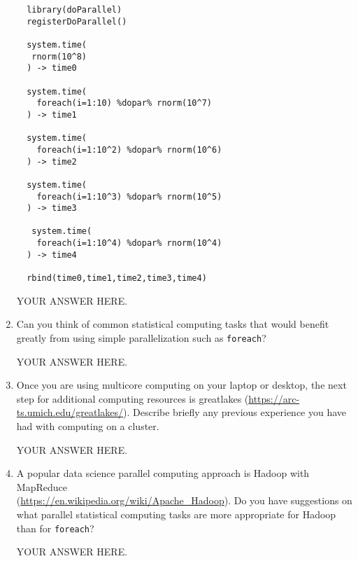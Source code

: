 \documentclass[12pt]{article}
\begin{document}
\begin{enumerate}
\begin{verbatim} 
  library(doParallel)
  registerDoParallel()

  system.time(
   rnorm(10^8)
  ) -> time0

  system.time(
    foreach(i=1:10) %dopar% rnorm(10^7)
  ) -> time1

  system.time(
    foreach(i=1:10^2) %dopar% rnorm(10^6)
  ) -> time2

  system.time(
    foreach(i=1:10^3) %dopar% rnorm(10^5)
  ) -> time3

   system.time(
    foreach(i=1:10^4) %dopar% rnorm(10^4)
  ) -> time4
  
  rbind(time0,time1,time2,time3,time4)
\end{verbatim}

  YOUR ANSWER HERE.

\item Can you think of common statistical computing tasks that would benefit greatly from using simple parallelization such as \texttt{foreach}?
  
YOUR ANSWER HERE.

\item Once you are using multicore computing on your laptop or desktop, the next step for additional computing resources is greatlakes (\url{https://arc-ts.umich.edu/greatlakes/}). Describe briefly any previous experience you have had with computing on a cluster.

  YOUR ANSWER HERE.

\item A popular data science parallel computing approach is Hadoop with MapReduce\\
(\url{https://en.wikipedia.org/wiki/Apache_Hadoop}). Do you have suggestions on what parallel statistical computing tasks are more appropriate for Hadoop than for \texttt{foreach}?

  YOUR ANSWER HERE.
  
\end{enumerate}
\end{document}
